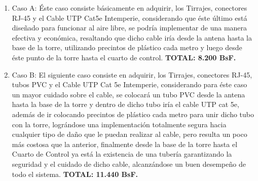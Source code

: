 \documentclass[11pt, a4paper, twosides]{report}
\begin{document}
\begin{enumerate}
    \item Caso A:
    Éste caso consiste básicamente en adquirir, los Tirrajes, conectores RJ-45 y el Cable UTP Cat5e Intemperie, considerando que éste último está diseñado para funcionar al aire libre, se podría implementar de una manera efectiva y económica, resaltando que dicho cable iría desde la antena hasta la base de la torre, utilizando precintos de plástico cada metro y luego desde éste punto de la torre hasta el cuarto de control. \textbf{TOTAL: 8.200 BsF.} 
    \begin{table}[h]
        \centering
       \caption{Lista de precios y elementos}
       \label{tab:4}
    \end{table}
    \newpage
    \item Caso B:
    El siguiente caso consiste en adquirir, los Tirrajes, conectores RJ-45, tubos PVC y el Cable UTP Cat 5e Intemperie, considerando para éste caso un mayor cuidado sobre el cable, se colocará un tubo PVC desde la antena hasta la base de la torre y dentro de dicho tubo iría el cable UTP cat 5e, además de ir colocando precintos de plástico cada metro para unir dicho tubo con la torre, lográndose una implementación totalmente segura hacia cualquier tipo de daño que le puedan realizar al cable, pero resulta un poco más costosa que la anterior, finalmente desde la base de la torre hasta el Cuarto de Control ya está la existencia de una tubería garantizando la seguridad y el cuidado de dicho cable, alcanzándose un buen desempeño de todo el sistema. \textbf{TOTAL: 11.440 BsF.} 
    \begin{table}[h]
        \centering
\end{table}
\end{enumerate}
\end{document}

